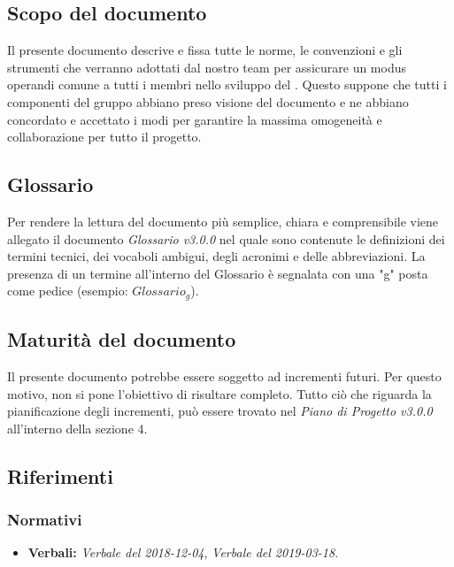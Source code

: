 \subsection{Scopo del documento}
Il presente documento descrive e fissa tutte le norme, le convenzioni e gli strumenti che verranno adottati dal nostro team per assicurare un modus operandi comune a tutti i membri nello sviluppo del . Questo suppone che tutti i componenti del gruppo abbiano preso visione del documento e ne abbiano concordato e accettato i modi per garantire la massima omogeneità e collaborazione per tutto il progetto.
\subsection{Glossario}
Per rendere la lettura del documento più semplice, chiara e comprensibile viene allegato il documento \emph{Glossario v3.0.0} nel quale sono contenute le definizioni dei termini tecnici, dei vocaboli ambigui, degli acronimi e delle abbreviazioni. La presenza di un termine all'interno del Glossario è segnalata con una "g" posta come pedice (esempio: $Glossario_{g}$).
\subsection{Maturità del documento}
Il presente documento potrebbe essere soggetto ad incrementi futuri. Per questo motivo, non si pone l'obiettivo di risultare completo.
Tutto ciò che riguarda la pianificazione degli incrementi, può essere trovato nel \emph{Piano di Progetto v3.0.0} all'interno della sezione 4.
\subsection{Riferimenti}
\subsubsection{Normativi}
\begin{itemize}
	\item \textbf{Verbali:} \emph{Verbale del 2018-12-04}, \emph{Verbale del 2019-03-18}.
\end{itemize}
